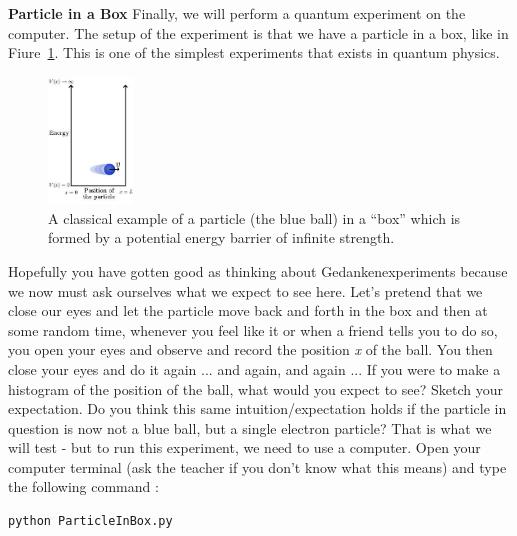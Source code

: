 \documentclass[12pt]{article}
\begin{document}
\newline
\newline
\textbf{Particle in a Box}
\newline
Finally, we will perform a quantum experiment on the computer.  The setup of the experiment is that we have a particle in a box, like in Fiure~\ref{fig:box}.  This is one of the simplest experiments that exists in quantum physics.  
\begin{figure}[!ht]
\centering
\includegraphics[width=0.2\textwidth]{pib.jpg}
\caption{A classical example of a particle (the blue ball) in a ``box'' which is formed by a potential energy barrier of infinite strength.}
\label{fig:box}
\end{figure}
\newpage
Hopefully you have gotten good as thinking about Gedankenexperiments because we now must ask ourselves what we expect to see here.  Let's pretend that we close our eyes and let the particle move back and forth in the box and then at some random time, whenever you feel like it or when a friend tells you to do so, you open your eyes and observe and record the position \textit{x} of the ball.  You then close your eyes and do it again ... and again, and again ... If you were to make a histogram of the position of the ball, what would you expect to see?  Sketch your expectation.
\newline
\newline
Do you think this same intuition/expectation holds if the particle in question is now not a blue ball, but a single electron particle?  That is what we will test - but to run this experiment, we need to use a computer.
\newline
\newline
Open your computer terminal (ask the teacher if you don't know what this means) and type the following command :
\newline
\begin{lstlisting}
python ParticleInBox.py
\end{lstlisting}
\end{document}
